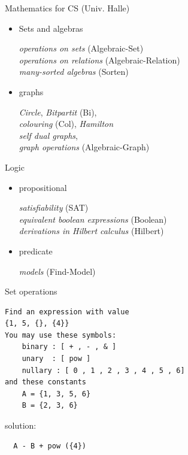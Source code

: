 \begin{slide}{Mathematics for CS (Univ. Halle)}

\begin{itemize}
\item
   Sets and algebras

  \emph{operations on sets}  (Algebraic-Set)
  \\  \emph{operations on relations}  (Algebraic-Relation)
  \\ \emph{many-sorted algebras} (Sorten)
\item
  graphs
  
  \emph{Circle}, \emph{Bitpartit} (Bi),
  \\ \emph{colouring} (Col), \emph{Hamilton} 
  \\ \emph{self dual graphs}, 
  \\ \emph{graph operations} (Algebraic-Graph)
\end{itemize}

\end{slide}
\begin{slide}{Logic}

\begin{itemize}
\item
   propositional

  \emph{satisfiability} (SAT)
  \\ \emph{equivalent boolean expressions} (Boolean)
  \\ \emph{derivations in Hilbert calculus} (Hilbert)
\item
   predicate
  
  \emph{models} (Find-Model)
\end{itemize}

\end{slide}
\begin{slide}{Set operations}
\begin{verbatim}  
Find an expression with value
{1, 5, {}, {4}}
You may use these symbols:
    binary : [ + , - , & ]
    unary  : [ pow ]
    nullary : [ 0 , 1 , 2 , 3 , 4 , 5 , 6]
and these constants
    A = {1, 3, 5, 6}
    B = {2, 3, 6}
\end{verbatim}

solution: \begin{verbatim}  A - B + pow ({4})  \end{verbatim}
\end{slide}
